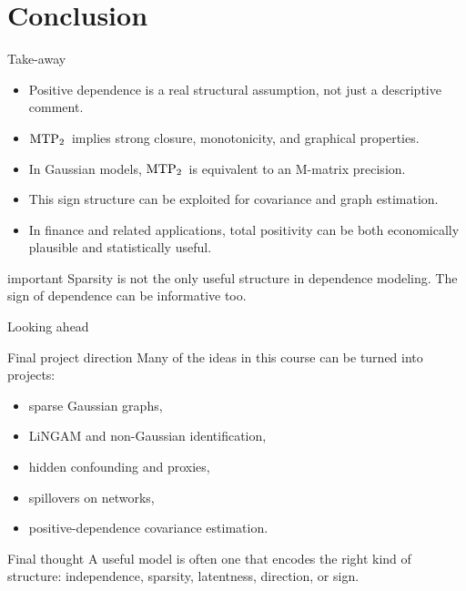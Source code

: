 \documentclass[dvipsnames,aspectratio=169,handout]{beamer}
\begin{document}

\section{Conclusion}

\begin{frame}{Take-away}
\begin{itemize}
    \item Positive dependence is a real structural assumption, not just a descriptive comment.
    \item ${\rm MTP}_{2}$\ implies strong closure, monotonicity, and graphical properties.
    \item In Gaussian models, ${\rm MTP}_{2}$\ is equivalent to an M-matrix precision.
    \item This sign structure can be exploited for covariance and graph estimation.
    \item In finance and related applications, total positivity can be both economically plausible and statistically useful.
\end{itemize}

\vspace{2mm}
\begin{beamercolorbox}[wd=\textwidth,sep=8pt,center,rounded=true,shadow=true]{important}
Sparsity is not the only useful structure in dependence modeling.
The sign of dependence can be informative too.
\end{beamercolorbox}
\end{frame}

\begin{frame}{Looking ahead}
\begin{block}{Final project direction}
Many of the ideas in this course can be turned into projects:
\begin{itemize}
    \item sparse Gaussian graphs,
    \item LiNGAM and non-Gaussian identification,
    \item hidden confounding and proxies,
    \item spillovers on networks,
    \item positive-dependence covariance estimation.
\end{itemize}
\end{block}

\begin{alertblock}{Final thought}
A useful model is often one that encodes the right kind of structure:
independence, sparsity, latentness, direction, or sign.
\end{alertblock}
\end{frame}
\end{document}
